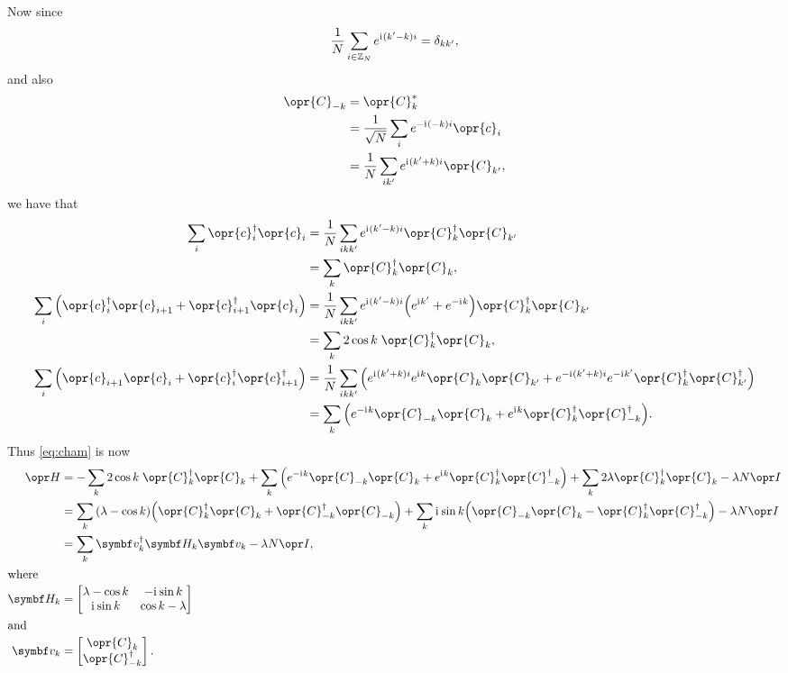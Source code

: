 \documentclass[../thesis.tex]{subfiles}
\begin{document}
Now since
\begin{equation}
  \frac{1}{N}\sum_{i\in\mathbb{Z}_N} e^{\mathrm{i}\mkern1mu(k' - k) i}
  = \delta_{kk'},
\end{equation}
and also
\begin{align}
  \opr{C}_{-k}
  &= \opr{C}_k^* \\
  &= \frac{1}{\sqrt{N}} \sum_i e^{-\im (-k)i} \opr{c}_i \\
  &= \frac{1}{N}\sum_{ik'} e^{\im (k' + k)i} \opr{C}_{k'},
\end{align}
we have that
\begin{align}
  \sum_i \opr{c}_i^\dag\opr{c}_i
  &= \frac{1}{N}\sum_{ikk'} e^{\im (k' - k)i}
  \opr{C}_k^\dag \opr{C}_{k'} \\
  &= \sum_k \opr{C}_k^\dag \opr{C}_k,
  \\
  \sum_i \qty(\opr{c}_i^\dag\opr{c}_{i+1} + \opr{c}_{i+1}^\dag\opr{c}_i)
  &= \frac{1}{N}\sum_{ikk'} e^{\im (k' - k)i} \qty(%
  e^{\im k'} + e^{-\im k} 
  ) \opr{C}_k^\dag \opr{C}_{k'} \\
  &= \sum_k 2 \cos k\; \opr{C}_k^\dag \opr{C}_k,
  \\
  \sum_i \qty(\opr{c}_{i+1}\opr{c}_i + \opr{c}_i^\dag\opr{c}_{i+1}^\dag)
  &= \frac{1}{N}\sum_{ikk'} \qty(%
  e^{\im (k' + k)i} e^{\im k} \opr{C}_{k}\opr{C}_{k'}
  + e^{-\im (k' + k)i} e^{-\im k'} \opr{C}_{k}^\dag\opr{C}_{k'}^\dag
  ) \\
  &= \sum_k \qty(%
  e^{-\im k} \opr{C}_{-k} \opr{C}_k
  + e^{\im k} \opr{C}_k^\dag \opr{C}_{-k}^\dag
  ).
\end{align}
Thus \cref{eq:cham} is now
\begin{align}
  \ham
  &= -\sum_k 2 \cos k\; \opr{C}_k^\dag \opr{C}_k
  + \sum_k \qty(%
  e^{-\im k} \opr{C}_{-k} \opr{C}_k
  + e^{\im k} \opr{C}_k^\dag \opr{C}_{-k}^\dag
  )
  + \sum_k 2\lambda\opr{C}_k^\dag\opr{C}_k
  - \lambda N \idopr
  \\
  &= \sum_k \qty(\lambda - \cos k)
  \qty(%
  \opr{C}_k^\dag \opr{C}_k
  + \opr{C}_{-k}^\dag \opr{C}_{-k}
  )
  + \sum_k \im\sin k
  \qty(%
  \opr{C}_{-k}\opr{C}_k
  - \opr{C}_k^\dag\opr{C}_{-k}^\dag
  )
  - \lambda N \idopr \\
  &= \sum_k \vq{v}_k^\dag \mq{H}_k \vq{v}_k
  - \lambda N \idopr,
  \label{eq:Cham} \\
  \shortintertext{where}
  \mq{H}_k
  &= \bmqty{%
  \lambda - \cos k & -\im\sin k \\
  \im\sin k & \cos k - \lambda
  } \\
  \shortintertext{and}
  \vq{v}_k
  &= \bmqty{\opr{C}_k \\ \opr{C}_{-k}^\dag}.
\end{align}
\end{document}
